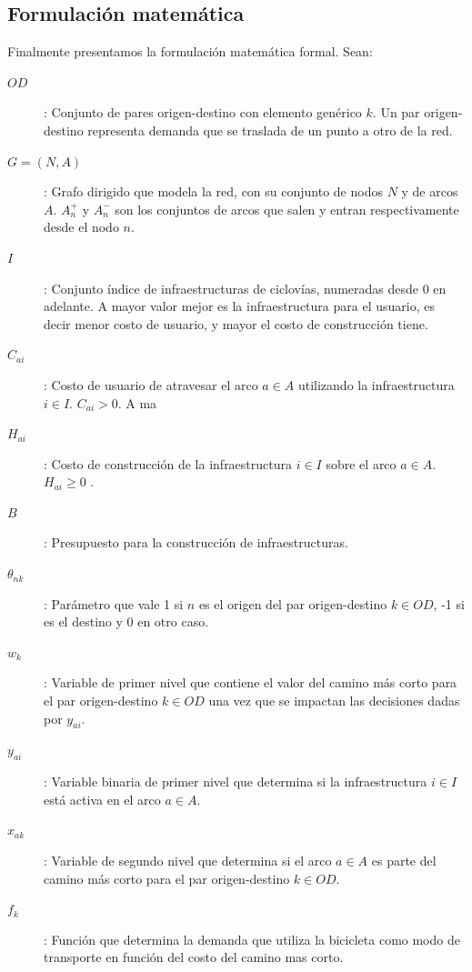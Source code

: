 \documentclass{article}
\begin{document}
  \subsection{Formulación matemática}

  Finalmente presentamos la formulación matemática formal. Sean:

  \begin{description}
    \item[$OD$]: Conjunto de pares origen-destino con elemento genérico $k$. Un par origen-destino representa demanda que se traslada de un punto a otro de la red.
    \item[$G=(N,A)$]: Grafo dirigido que modela la red, con su conjunto de nodos $N$ y de arcos $A$. $A_n^+$ y $A_n^-$ son los conjuntos de arcos que salen y entran respectivamente desde el nodo $n$.
    \item[$I$]: Conjunto índice de infraestructuras de ciclovías, numeradas desde $0$ en adelante. A mayor valor mejor es la infraestructura para el usuario, es decir menor costo de usuario, y mayor el costo de construcción tiene.
    \item[$C_{ai}$]: Costo de usuario de atravesar el arco $a \in A$ utilizando la infraestructura $i \in I$. $C_{ai} > 0$. A ma
    \item[$H_{ai}$]: Costo de construcción de la infraestructura $i \in I$ sobre el arco $a \in A$. $H_{ai} \geq 0$ .
    \item[$B$]: Presupuesto para la construcción de infraestructuras.
    \item[$\theta_{nk}$]: Parámetro que vale 1 si $n$ es el origen del par origen-destino $k \in OD$, -1 si es el destino y 0 en otro caso.
    \item[$w_k$]: Variable de primer nivel que contiene el valor del camino más corto para el par origen-destino $k \in OD$ una vez que se impactan las decisiones dadas por $y_{ai}$.
    \item[$y_{ai}$]: Variable binaria de primer nivel que determina si la infraestructura $i \in I$ está activa en el arco $a \in A$.
    \item[$x_{ak}$]: Variable de segundo nivel que determina si el arco $a \in A$ es parte del camino más corto para el par origen-destino $k \in OD$.
    \item[$f_k$]: Función que determina la demanda que utiliza la bicicleta como modo de transporte en función del costo del camino mas corto.
  \end{description}
\end{document}
